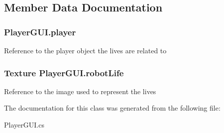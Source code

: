 \subsection{Member Data Documentation}
\hypertarget{class_player_g_u_i_a40c0f7c540fc730e1991db977edbcfb4}{
\subsubsection[{player}]{ Player\-G\-U\-I.\-player}}\label{class_player_g_u_i_a40c0f7c540fc730e1991db977edbcfb4}
Reference to the player object the lives are related to \hypertarget{class_player_g_u_i_a71b0c8060bfd05c34d73ff6f271fd24b}{
\subsubsection[{robot\-Life}]{\setlength{\rightskip}{0pt plus 5cm}Texture Player\-G\-U\-I.\-robot\-Life}}\label{class_player_g_u_i_a71b0c8060bfd05c34d73ff6f271fd24b}
Reference to the image used to represent the lives 

The documentation for this class was generated from the following file\-:\begin{DoxyCompactItemize}
\item 
Player\-G\-U\-I.\-cs\end{DoxyCompactItemize}
